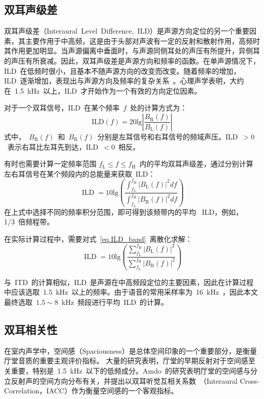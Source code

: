 \subsection{ 双耳声级差 }

双耳声级差（Interaural~Level~Difference,~ILD）是声源方向定位的另一个重要因素，其主要作用于中高频，这是由于头部对声波有一定的反射和散射作用，高频时其作用更加明显。当声源偏离中垂面时，与声源同侧耳处的声压有所提升，异侧耳的声压有所衰减。因此，双耳声级差是声源方向和频率的函数。在单声源情况下，ILD~在低频时很小，且基本不随声源方向的改变而改变。随着频率的增加，ILD~逐渐增加，表现出与声源方向及频率的复杂关系~。心理声学表明，大约在~1.5~kHz~以上，ILD~才开始作为一个有效的方向定位因素。

对于一个双耳信号，ILD~在某个频率~$f$~处的计算方式为：
\begin{equation}
\text{ILD}(f)=20\text{lg}\left|\frac{B_{\text{R}}(f)}{B_{\text{L}}(f)}\right|
\end{equation}
式中，~$B_{\text{R}}(f)$~和~$B_{\text{R}}(f)$~分别是左耳信号和右耳信号的频域声压。ILD~$> 0$~表示右耳比左耳先到达，ILD~$< 0$~相反。

有时也需要计算一定频率范围 $f_{\mathrm{L}} \leqslant f \leqslant f_{\mathrm{H}}$~内的平均双耳声级差，通过分别计算左右耳信号在某个频段内的总能量来获取~ILD：
\begin{equation}\label{eq.ILD_band}
\operatorname{ILD} =10 \text{lg} \left( \frac{\int_{f_{\mathrm{L}}}^{f_{\mathrm{H}}}\left|B_{\mathrm{L}}\left( f \right)\right|^{2} d f}{\int_{f_{\mathrm{L}}}^{f_{\mathrm{H}}}\left|B_{\mathrm{R}}\left(f \right)\right|^{2} d f} \right)
\end{equation}
在上式中选择不同的频率积分范围，即可得到该频带内的平均 ~ILD，例如，1/3~倍频程带。

在实际计算过程中，需要对式~\eqref{eq.ILD_band}~离散化求解：
\begin{equation}
\operatorname{ILD} =10 \text{lg} \left(\frac{ \sum_{f_{\mathrm{L}}}^{f_{\mathrm{H}}}\left|B_{\mathrm{L}}\left( f \right)\right|^{2} } { \sum_{f_{\mathrm{L}}}^{f_{\mathrm{H}}}\left|B_{\mathrm{R}}\left(f \right)\right|^{2} }\right)
\end{equation}

与~ITD~的计算相似，ILD~是声源在中高频段定位的主要因素，因此在计算过程中应该选取~1.5~kHz~以上的频率。由于语音的常用采样率为~16~kHz~，因此本文最终选取~$1.5\sim 8$~kHz~频段进行平均~ILD~的计算。

\subsection{ 双耳相关性 }
在室内声学中，空间感（Spaciousness）是总体空间印象的一个重要部分，是衡量厅堂音质的重要主观评价指标。
大量的研究表明，厅堂的早期反射对于空间感至关重要，特别是~1.5~kHz~以下的低频成分。Amdo~的研究表明厅堂的空间感与分立反射声的空间方向分布有关，并提出以双耳听觉互相关系数~（Interaural Cross-Correlation，IACC）作为衡量空间感的一个客观指标。

